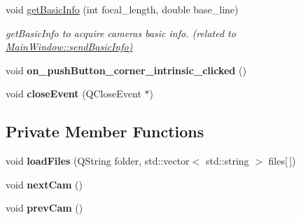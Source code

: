\begin{DoxyCompactItemize}
\item 
void \hyperlink{classcalibration_form_a1b1f997c7f6d4a592b05e74f53e5b1a8}{get\+Basic\+Info} (int focal\+\_\+length, double base\+\_\+line)
\begin{DoxyCompactList}\small\item\em get\+Basic\+Info to acquire camera\textquotesingle{}s basic info. (related to \hyperlink{}{Main\+Window\+::send\+Basic\+Info)}\end{DoxyCompactList}\item 
\hypertarget{classcalibration_form_a1774fe86a4c7d6d93a4cddefa213a895}{}void {\bfseries on\+\_\+push\+Button\+\_\+corner\+\_\+intrinsic\+\_\+clicked} ()\label{classcalibration_form_a1774fe86a4c7d6d93a4cddefa213a895}

\item 
\hypertarget{classcalibration_form_aebd11d316b6b138ae5685e9047aec962}{}void {\bfseries close\+Event} (Q\+Close\+Event $\ast$)\label{classcalibration_form_aebd11d316b6b138ae5685e9047aec962}

\end{DoxyCompactItemize}
\subsection*{Private Member Functions}
\begin{DoxyCompactItemize}
\item 
\hypertarget{classcalibration_form_aab14476d02bc9543366f4672734c2f7e}{}void {\bfseries load\+Files} (Q\+String folder, std\+::vector$<$ std\+::string $>$ files\mbox{[}$\,$\mbox{]})\label{classcalibration_form_aab14476d02bc9543366f4672734c2f7e}

\item 
\hypertarget{classcalibration_form_a7c5a1fcb7443d7cf31e60c698c328c2e}{}void {\bfseries next\+Cam} ()\label{classcalibration_form_a7c5a1fcb7443d7cf31e60c698c328c2e}

\item 
\hypertarget{classcalibration_form_a73fd9e30a9926512d208e421e30c1045}{}void {\bfseries prev\+Cam} ()\label{classcalibration_form_a73fd9e30a9926512d208e421e30c1045}

\end{DoxyCompactItemize}
